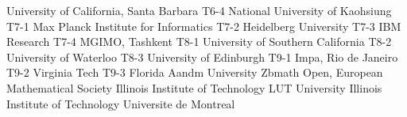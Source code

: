 \begin{multicols}{2}
{University of California, Santa Barbara}
{T6-4}
{}
{National University of Kaohsiung}
{T7-1}
{}
{Max Planck Institute for Informatics}
{T7-2}
{}
{Heidelberg University}
{T7-3}
{}
{IBM Research}
{T7-4}
{}
{MGIMO, Tashkent}
{T8-1}
{}
{University of Southern California}
{T8-2}
{}
{University of Waterloo}
{T8-3}
{}
{University of Edinburgh}
{T9-1}
{}
{Impa, Rio de Janeiro}
{T9-2}
{}
{Virginia Tech}
{T9-3}
{}
{Florida Aandm University}
{}
{}
{Zbmath Open, European Mathematical Society}
{}
{}
{Illinois Institute of Technology}
{}
{}
{LUT University}
{}
{}
{Illinois Institute of Technology}
{}
{}
{Universite de Montreal}
{}
{}
\end{multicols}

